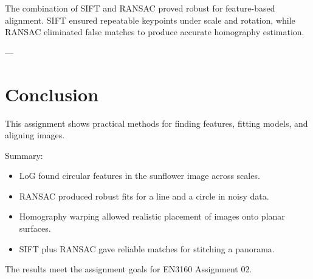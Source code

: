 \documentclass[11pt,a4paper]{article}
\begin{document}
The combination of SIFT and RANSAC proved robust for feature-based alignment. SIFT ensured repeatable keypoints under scale and rotation, while RANSAC eliminated false matches to produce accurate homography estimation.

---

\section{Conclusion}
This assignment shows practical methods for finding features, fitting models, and aligning images.

Summary:
\begin{itemize}
\item LoG found circular features in the sunflower image across scales.
\item RANSAC produced robust fits for a line and a circle in noisy data.
\item Homography warping allowed realistic placement of images onto planar surfaces.
\item SIFT plus RANSAC gave reliable matches for stitching a panorama.
\end{itemize}

The results meet the assignment goals for EN3160 Assignment 02.
\end{document}
